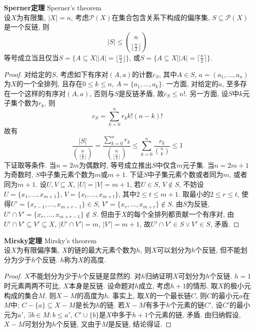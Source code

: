 \begin{thm} \textbf{Sperner定理} Sperner's theorem\\
设$X$为有限集, $|X|=n$, 考虑$\mathcal{P}(X)$在集合包含关系下构成的偏序集, $S\subseteq \mathcal{P}(X)$是一个反链, 则$$|S| \le \binom{n}{\lfloor \frac{n}{2}\rfloor}$$
等号成立当且仅当$S=\{A\subseteq X\vert |A|=\lfloor \frac{n}{2}\rfloor\}$, 或$S=\{A\subseteq X\vert |A|=\lceil \frac{n}{2}\rceil\}$.
\label{thm:Sperner}
\end{thm}
\begin{proof}
对给定的$S$, 考虑如下有序对$(A,a)$的计数$c_S$, 其中$A\in S$, $a=(a_1,\dots, a_n)$为$X$的一个全排列, 且存在$0\le k\le n$, $A=\{a_1,\dots, a_k\}$. 一方面, 对给定的$a$, 至多存在一个这样的有序对$(A,a)$, 否则与$S$是反链矛盾, 故$c_S\le n!$. 另一方面, 设$S$中$k$元子集个数为$r_k$, 则
\begin{equation}
    c_S=\sum_{k=0}^n r_k k!(n-k)!
\end{equation}
故有
\begin{equation}
    \frac{|S|}{\binom{n}{\lfloor\frac{n}{2}\rfloor}} = \frac{\sum_{k=0}^n r_k}{\binom{n}{\lfloor\frac{n}{2}\rfloor}}\le \sum_{k=0}^n \frac{r_k}{\binom{n}{k}}\le 1
\end{equation}
下证取等条件. 当$n=2m$为偶数时, 等号成立推出$S$中仅含$m$元子集. 当$n=2m+1$为奇数时, $S$中子集元素个数为$m$或$m+1$. 下证$S$中子集元素个数或者同为$m$, 或者同为$m+1$. 设$U,V\subseteq X$, $|U|=|V|=m+1$, 若$U\in S$, $V\notin S$, 不妨设$U=\{x_1,\dots, x_{m+1}\}$, $V=\{x_t, \dots, x_{m+t}\}$, 其中$2\le t\le m+1$. 取最小的$2\le r\le t$, 使得$U'=\{x_{r-1}, \dots, x_{m+r-1}\}\in S$, $V'=\{x_r, \dots, x_{m+r}\}\notin S$. 由$S$为反链, $U'\cap V'=\{x_r, \dots, x_{m+r-1}\}\notin S$. 但由于$X$的每个全排列都贡献一个有序对, 由$U'\cap V'\subseteq V'\subseteq X$, $|U'\cap V'|=m$, $|V'|=m+1$, 故$U'\cap V'\in S \lor V'\in S$, 矛盾. 
\end{proof}

\begin{thm} \textbf{Mirsky定理} Mirsky's theorem\\
设$X$为有限偏序集, $X$的链的最大元素个数为$h$, 则$X$可以划分为$h$个反链, 但不能划分为少于$h$个反链. $h$称为$X$的高度. 
\end{thm}
\begin{proof}
$X$不能划分为少于$h$个反链是显然的. 对$h$归纳证明$X$可划分为$h$个反链. $h=1$时元素两两不可比, $X$本身是反链. 设命题对$h$成立, 考虑$h+1$的情形. 取$X$的极小元构成的集合$M$, 则$X-M$的高度为$h$. 事实上, 取$X$的一个最长链$C$, 则$C$的最小元$a$在$M$中; $C-\{a\}\subseteq X-M$是长为$h$的链. 若$X-M$有多于$h$个元素的链$C'$, 设$C'$的最小元为$a'$, $\exists b\in M: b\le a'$, $C'\cup \{b\}$是$X$中多于$h+1$个元素的链, 矛盾. 由归纳假设, $X-M$可划分为$h$个反链, 又由于$M$是反链, 结论得证. 
\end{proof}

